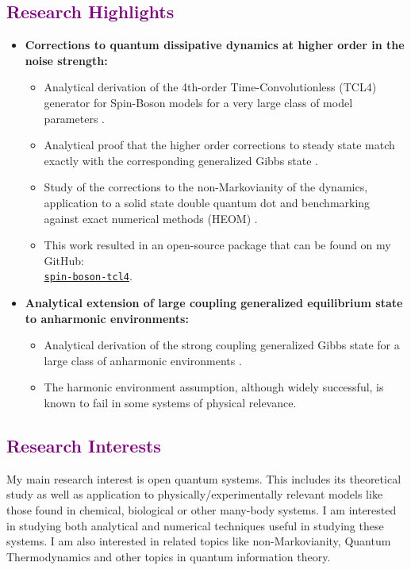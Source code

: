 \documentclass[a4paper,11pt]{article}
\newcommand{\sectionheading}[1]{\subsection*{\textcolor{purple}{#1}}}
\begin{document}
\sectionheading{Research Highlights}
\begin{itemize}[leftmargin=*]
    \item \textbf{Corrections to quantum dissipative dynamics at higher order in the noise strength:}
    \begin{itemize}
        \item Analytical derivation of the 4th-order Time-Convolutionless (TCL4) generator for Spin-Boson models for a very large class of model parameters \cite{Kumar2025TCL4, Kumar2025MF}.
        \item Analytical proof that the higher order corrections to steady state match exactly with the corresponding generalized Gibbs state \cite{Kumar2025MF}. 
        \item Study of the corrections to the non-Markovianity of the dynamics, application to a solid state double quantum dot and benchmarking against exact numerical methods (HEOM) \cite{Kumar2025TCL4}.
        \item This work resulted in an open-source package that can be found on my GitHub: \\
        \href{https://github.com/prem314/spin-boson-tcl4}{\texttt{spin-boson-tcl4}}.
    \end{itemize}
    \item \textbf{Analytical extension of large coupling generalized equilibrium state to anharmonic environments:}
    \begin{itemize}
        \item Analytical derivation of the strong coupling generalized Gibbs state for a large class of anharmonic environments \cite{Kumar2024Anharm}.
        \item The harmonic environment assumption, although widely successful, is known to fail in some systems of physical relevance. 
    \end{itemize}
\end{itemize}


\sectionheading{Research Interests}

My main research interest is open quantum systems. This includes its theoretical study as well as application to physically/experimentally relevant models like those found in chemical, biological or other many-body systems. I am interested in studying both analytical and numerical techniques useful in studying these systems. I am also interested in related topics like non-Markovianity, Quantum Thermodynamics and other topics in quantum information theory.
\end{document}
